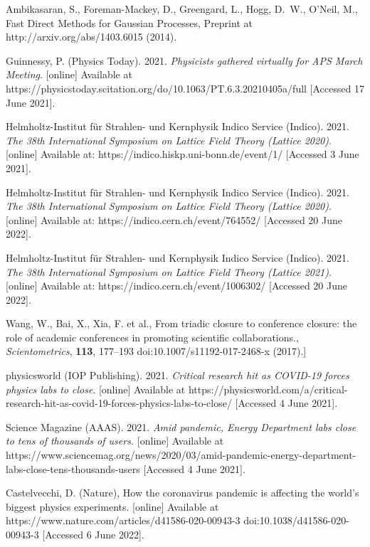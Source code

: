 \documentclass[]{rsos}%
\begin{document}
\begin{thebibliography}{10}
{Ambikasaran, S., Foreman-Mackey, D., Greengard, L., Hogg, D.~W., O'Neil, M.,}
{Fast Direct Methods for Gaussian Processes}, Preprint at http://arxiv.org/abs/1403.6015 \newblock (2014).

Guinnessy, P. (Physics Today). 2021. \emph{Physicists gathered virtually for APS March Meeting}. [online] Available at {https://physicstoday.scitation.org/do/10.1063/PT.6.3.20210405a/full} [Accessed 17 June 2021].
 
Helmholtz-Institut f\"ur Strahlen- und Kernphysik Indico Service (Indico). 2021. \emph{The 38th International Symposium on Lattice Field Theory (Lattice 2020)}. [online] Available at: {https://indico.hiskp.uni-bonn.de/event/1/} [Accessed 3 June 2021].

Helmholtz-Institut f\"ur Strahlen- und Kernphysik Indico Service (Indico). 2021. \emph{The 38th International Symposium on Lattice Field Theory (Lattice 2020)}. [online] Available at: {https://indico.cern.ch/event/764552/} [Accessed 20 June 2022].

Helmholtz-Institut f\"ur Strahlen- und Kernphysik Indico Service (Indico). 2021. \emph{The 38th International Symposium on Lattice Field Theory (Lattice 2021)}. [online] Available at: {https://indico.cern.ch/event/1006302/} [Accessed 20 June 2022].

{Wang, W., Bai, X., Xia, F. et al.}, {From triadic closure to conference closure: the role of academic conferences in promoting scientific collaborations.}, \emph{Scientometrics}, \textbf{113}, 177–193  doi:10.1007/s11192-017-2468-x \newblock (2017).]

physicsworld (IOP Publishing). 2021. \emph{Critical research hit as COVID-19 forces physics labs to close}. [online] Available at {https://physicsworld.com/a/critical-research-hit-as-covid-19-forces-physics-labs-to-close/} [Accessed 4 June 2021].


Science Magazine (AAAS). 2021. \emph{Amid pandemic, Energy Department labs close to tens of thousands of users.} [online] Available at {https://www.sciencemag.org/news/2020/03/amid-pandemic-energy-department-labs-close-tens-thousands-users} [Accessed 4 June 2021].

Castelvecchi, D. (Nature), {How the coronavirus pandemic is affecting the world's biggest physics experiments.} [online] Available at {https://www.nature.com/articles/d41586-020-00943-3} doi:10.1038/d41586-020-00943-3 [Accessed 6 June 2022].


\end{thebibliography}
\end{document}

